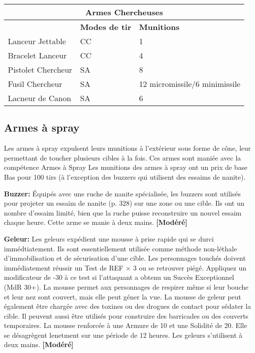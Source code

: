 \begin{table} \begin{tabular}{|l|l|l|} \hline

\multicolumn{3}{|c|}{\textbf{Armes Chercheuses}} \\ \hline

&\textbf{Modes de tir}	&\textbf{Munitions} \\ \hline

Lanceur Jettable	&CC	&1 \\ \hline

Bracelet Lanceur	&CC	&4 \\ \hline

Pistolet Chercheur	&SA	&8 \\ \hline

Fusil Chercheur	&SA	&12 micromissile/6 minimissile \\ \hline

Lacneur de Canon	&SA	&6 \\ \hline

\end{tabular} \label{tab:seeker-weapons} \end{table} 

\subsection{Armes à spray} \label{sec:spray-weapons} 

Les armes à spray expulsent leurs munitions à l'extérieur sous forme de cône, leur permettant de toucher plusieurs cibles à la fois. Ces armes sont maniée avec la compétence Armes à Spray Les munitions des armes à spray ont un prix de base Bas pour 100 tirs (à l'exception des buzzers qui utilisent des essaims de nanite). 

\textbf{Buzzer:} Équipés avec une ruche de nanite spécialisée, les buzzers sont utilisés pour projeter un essaim de nanite (p. 328) sur une zone ou une cible. Ils ont un nombre d'essaim limité, bien que la ruche puisse reconstruire un nouvel essaim chaque heure. Cette arme se manie à deux mains. \textbf{[Modéré]} 

\textbf{Geleur:} Les geleurs expédient une mousse à prise rapide qui se durci immédtiatement. Ils sont essentiellement utilisée comme méthode non-léthale d'immobilisation et de sécurisation d'une cible. Les personnages touchés doivent immédiatement réussir un Test  de REF $\times$ 3 ou se retrouver piégé. Appliquez un modificateur de -30 à ce test si l'attaquant a obtenu un Succès Exceptionnel (MdR 30+). La mousse permet aux personnages de respirer même si leur bouche et leur nez sont couvert, mais elle peut géner la vue. La mousse de geleur peut également être chargée avec des toxines ou des drogues de contact pour sédater la cible. Il peuvent aussi être utilisés pour construire des barricades ou des couverts temporaires. La mousse renforcée à une Armure de 10 et une Solidité de 20. Elle se désagrègent lenetment sur une période de 12 heures. Les geleurs s'utilisent à deux mains. \textbf{[Modéré]} 

